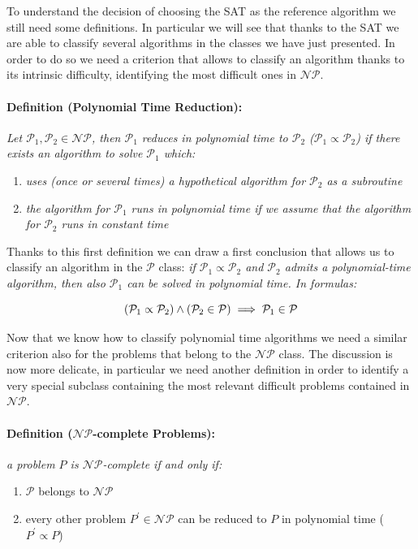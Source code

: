 \documentclass[english]{article}
\begin{document}
			To understand the decision of choosing the SAT as the reference algorithm we still need some definitions. In particular we will see that thanks to the SAT we are able to classify several algorithms in the classes we have just presented. In order to do so we need a criterion that allows to classify an algorithm thanks to its intrinsic difficulty, identifying the most difficult ones in $\mathcal{N}\mathcal{P}$.
			
			\paragraph{Definition (Polynomial Time Reduction):} \emph{Let $\mathcal{P}_1, \mathcal{P}_2 \in \mathcal{N}\mathcal{P}$, then $\mathcal{P}_1$ reduces in polynomial time to $\mathcal{P}_2$ ($\mathcal{P}_1 \propto \mathcal{P}_2$) if there exists an algorithm to solve $\mathcal{P}_1$ which:}
			\begin{enumerate}[label=(\roman*)]
				\item \emph{uses (once or several times) a hypothetical algorithm for $\mathcal{P}_2$ as a subroutine}
				
				\item \emph{the algorithm for $\mathcal{P}_1$ runs in polynomial time if we assume that the algorithm for $\mathcal{P}_2$ runs in constant time}
			\end{enumerate}
		
			Thanks to this first definition we can draw a first conclusion that allows us to classify an algorithm in the $\mathcal{P}$ class: \emph{if $\mathcal{P}_1\propto\mathcal{P}_2$ and $\mathcal{P}_2$ admits a polynomial-time algorithm, then also $\mathcal{P}_1$ can be solved in polynomial time. In formulas:}
			
			\begin{equation*}
				\centering
				(\mathcal{P}_1\propto\mathcal{P}_2) \land (\mathcal{P}_2 \in \mathcal{P}) \implies \mathcal{P}_1 \in \mathcal{P}
			\end{equation*}
		
			Now that we know how to classify polynomial time algorithms we need a similar criterion also for the problems that belong to the $\mathcal{N}\mathcal{P}$ class. The discussion is now more delicate, in particular we need another definition in order to identify a very special subclass containing the most relevant difficult problems contained in $\mathcal{N}\mathcal{P}$.
			
			\paragraph{Definition ($\mathcal{N}\mathcal{P}$-complete Problems):} \emph{a problem $P$ is $\mathcal{N}\mathcal{P}$-complete if and only if:}
			\begin{enumerate}[label=(\roman*)]
				\item $\mathcal{P}$ belongs to $\mathcal{N}\mathcal{P}$
				
				\item every other problem $P^{'}\in\mathcal{N}\mathcal{P}$ can be reduced to $P$ in polynomial time ($P^{'}\propto P$)
			\end{enumerate}
			 
\end{document}
